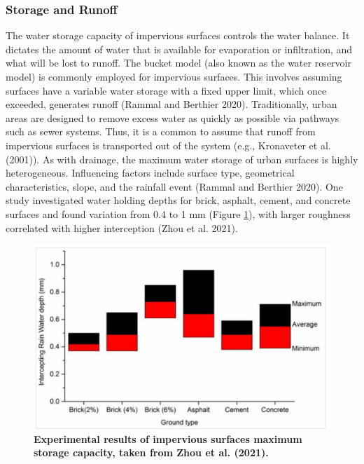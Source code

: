 \documentclass[final,3p,times,authoryear]{elsarticle}
\begin{document}
\subsubsection{Storage and Runoff}\label{sec:appendix7.1.3.3}

The water storage capacity of impervious surfaces controls the water balance. It dictates
the amount of water that is available for evaporation or infiltration, and what will be lost
to runoff.
The bucket model (also known as the water reservoir model) is commonly employed for
impervious surfaces. This involves assuming surfaces have a variable water storage with
a fixed upper limit, which once exceeded, generates runoff (Rammal and Berthier
2020). Traditionally, urban areas are designed to remove excess water as quickly as
possible via pathways such as sewer systems. Thus, it is a common to assume that runoff from impervious surfaces is transported out of the system (e.g., Kronaveter et al.
(2001)).
As with drainage, the maximum water storage of urban surfaces is highly
heterogeneous. Influencing factors include surface type, geometrical characteristics,
slope, and the rainfall event (Rammal and Berthier 2020). One study investigated water
holding depths for brick, asphalt, cement, and concrete surfaces and found variation
from 0.4 to 1 mm (Figure \ref{fig:7.2}), with larger roughness correlated with higher interception
(Zhou et al. 2021).

\begin{figure}
\centering
\includegraphics[trim={0 0 0 0},clip,scale=1.0]{Impervious.png}
\caption{\bf Experimental results of impervious surfaces maximum storage capacity, taken from Zhou et
al. (2021).}
 \label{fig:7.2}
\end{figure}
\end{document}
